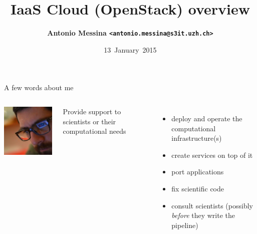 \documentclass[english,serif,mathserif,usenames,dvipsnames]{beamer}
\begin{document}
\title[IaaS (OpenStack) overview]{IaaS Cloud (OpenStack) overview}

\author{%
  {\bfseries Antonio Messina \texttt{<antonio.messina@s3it.uzh.ch>}}  
}

\date{13~January~2015}

\maketitle

\begin{frame}
  {A few words about me}
  \scriptsize

  \begin{columns}
    \includegraphics[width=\linewidth]{avatar.jpeg}

    Provide support to scientists or their computational needs
    
    \+
    \pause
    \begin{itemize}
    \item deploy and operate the computational infrastructure(s)
    \item create services on top of it
    \item port applications
    \item fix scientific code
    \item consult scientists (possibly \textit{before} they write the
      pipeline)
    \end{itemize}


\end{columns}
\end{frame}
\end{document}
